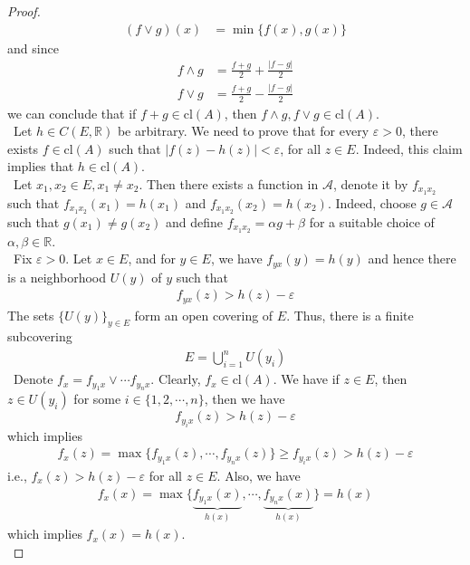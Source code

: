 \documentclass[12pt,leqno]{amsart}
\theoremstyle{definition}
\numberwithin{equation}{subsection}
\begin{document}
\begin{proof}
\begin{align*}
    (f \vee g)(x) & = \min\{f(x),g(x)\}
\end{align*}
and since 
\begin{align*}
    f \wedge g & = \frac{f+g}{2} + \frac{|f-g|}{2} \\
    f \vee g & = \frac{f+g}{2} - \frac{|f-g|}{2}
\end{align*}
we can conclude that if $f+g\in\text{cl}(A)$, then $f\wedge g, f\vee g\in \text{cl}(A)$. \\
\hspace*{1em}\, Let $h\in C(E,\mathbb{R})$ be arbitrary. We need to prove that for every $\varepsilon > 0$, there exists $f\in\text{cl}(A)$ such that $|f(z) - h(z)| < \varepsilon$, for all $z\in E$. Indeed, this claim implies that $h\in \text{cl}(A)$.\\
\hspace*{1em}\, Let $x_1, x_2\in E, x_1\neq x_2$. Then there exists a function in $\mathcal{A}$, denote it by $f_{x_1 x_2}$ such that $f_{x_1 x_2}(x_1) = h(x_1)$ and $f_{x_1 x_2}(x_2) = h(x_2)$. Indeed, choose $g\in\mathcal{A}$ such that $g(x_1)\neq g(x_2)$ and define $f_{x_1 x_2} = \alpha g+\beta$ for a suitable choice of $\alpha, \beta\in\mathbb{R}$. \\
\hspace*{1em}\, Fix $\varepsilon > 0$. Let $x\in E$, and for $y\in E$, we have $f_{yx}(y) = h(y)$ and hence there is a neighborhood $U(y)$ of $y$ such that 
\begin{align*}
    f_{yx}(z) > h(z) - \varepsilon
\end{align*}
The sets $\{U(y)\}_{y\in E}$ form an open covering of $E$. Thus, there is a finite subcovering
\begin{align*}
    E = \bigcup^n_{i=1}U(y_i)
\end{align*}
\hspace*{1em}\, Denote $f_x = f_{y_1 x}\vee \cdots f_{y_n x}$. Clearly, $f_x\in \text{cl}(A)$. We have if $z\in E$, then $z\in U(y_i)$ for some $i\in\{1,2,\cdots,n\}$, then we have $$f_{y_i x}(z) > h(z) - \varepsilon$$
which implies 
\begin{align*}
    f_x(z) = \max\{f_{y_1 x}(z), \cdots, f_{y_n x}(z)\} \geq f_{y_i x}(z) > h(z) - \varepsilon
\end{align*}
i.e., $f_x(z) > h(z) - \varepsilon$ for all $z\in E$. Also, we have 
\begin{align*}
    f_x(x) = \max\{\underbrace{f_{y_1 x}(x)}_{h(x)}, \cdots, \underbrace{f_{y_n x}(x)}_{h(x)}\} = h(x)
\end{align*}
which implies $f_x(x) = h(x)$. \\

\end{proof}
\end{document}
